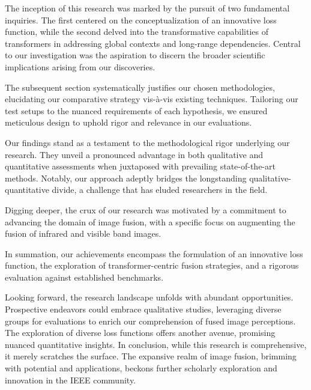 The inception of this research was marked by the pursuit of two fundamental inquiries. The first centered on the conceptualization of an innovative loss function, while the second delved into the transformative capabilities of transformers in addressing global contexts and long-range dependencies. Central to our investigation was the aspiration to discern the broader scientific implications arising from our discoveries.

The subsequent section systematically justifies our chosen methodologies, elucidating our comparative strategy vis-à-vis existing techniques. Tailoring our test setups to the nuanced requirements of each hypothesis, we ensured meticulous design to uphold rigor and relevance in our evaluations.

Our findings stand as a testament to the methodological rigor underlying our research. They unveil a pronounced advantage in both qualitative and quantitative assessments when juxtaposed with prevailing state-of-the-art methods. Notably, our approach adeptly bridges the longstanding qualitative-quantitative divide, a challenge that has eluded researchers in the field.

Digging deeper, the crux of our research was motivated by a commitment to advancing the domain of image fusion, with a specific focus on augmenting the fusion of infrared and visible band images.

In summation, our achievements encompass the formulation of an innovative loss function, the exploration of transformer-centric fusion strategies, and a rigorous evaluation against established benchmarks.

Looking forward, the research landscape unfolds with abundant opportunities. Prospective endeavors could embrace qualitative studies, leveraging diverse groups for evaluations to enrich our comprehension of fused image perceptions. The exploration of diverse loss functions offers another avenue, promising nuanced quantitative insights. In conclusion, while this research is comprehensive, it merely scratches the surface. The expansive realm of image fusion, brimming with potential and applications, beckons further scholarly exploration and innovation in the IEEE community.
